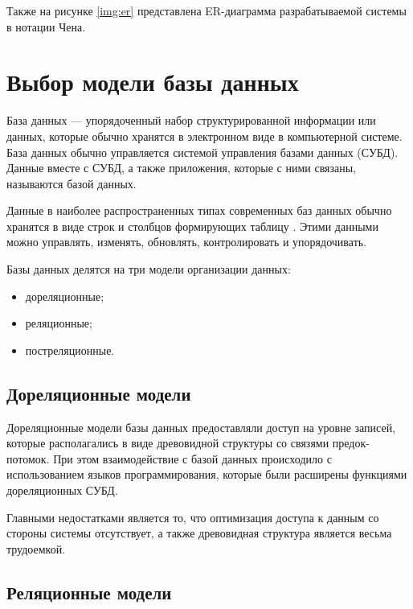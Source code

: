 Также на рисунке \ref{img:er} представлена ER-диаграмма \cite{er} разрабатываемой системы в нотации Чена.






\section{Выбор модели базы данных}

База данных \cite{db-is} --- упорядоченный набор структурированной информации или данных, которые обычно хранятся в электронном виде в компьютерной системе. База данных обычно управляется системой управления базами данных (СУБД). Данные вместе с СУБД, а также приложения, которые с ними связаны, называются базой данных.

Данные в наиболее распространенных типах современных баз данных обычно хранятся в виде строк и столбцов формирующих таблицу \cite{db-is}. Этими данными можно управлять, изменять, обновлять, контролировать и упорядочивать.

Базы данных делятся на три модели организации данных:

\begin{itemize}
    \item дореляционные;
    \item реляционные;
    \item постреляционные.
\end{itemize}


\subsection{Дореляционные модели}

Дореляционные модели базы данных \cite{pre_sql} предоставляли доступ на уровне записей, которые располагались в виде древовидной структуры со связями предок-потомок. При этом взаимодействие с базой данных происходило с использованием языков программирования, которые были расширены функциями дореляционных СУБД. 

Главными недостатками является то, что оптимизация доступа к данным со стороны системы отсутствует, а также древовидная структура является весьма трудоемкой.


\subsection{Реляционные модели}

